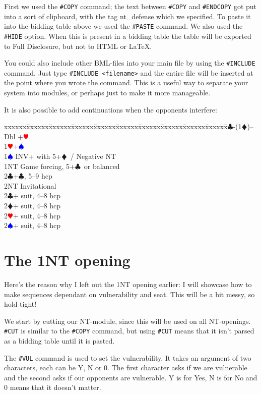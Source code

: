\documentclass[a4paper]{article}
\newcommand{\BC}{\textcolor{OliveGreen}{$\clubsuit$}}
\newcommand{\BD}{\textcolor{RedOrange}{$\vardiamondsuit$}}
\newcommand{\BH}{\textcolor{Red}{$\varheartsuit${}}}
\newcommand{\BS}{\textcolor{Blue}{$\spadesuit${}}}
\newenvironment{bidtable}
{\begin{tabbing}

xxxxxx\=xxxxxx\=xxxxxx\=xxxxxx\=xxxxxx\=xxxxxx\=xxxxxx\=xxxxxx\=xxxxxx\=xxxxxx\=\kill}
{\end{tabbing} }%
\begin{document}
First we used the \texttt{\#COPY} command; the text between \texttt{\#COPY} and \texttt{\#ENDCOPY}
got put into a sort of clipboard, with the tag nt\_defense which we
specified. To paste it into the bidding table above we used
the \texttt{\#PASTE} command. We also used the \texttt{\#HIDE} option. When this is
present in a bidding table the table will be exported to Full
Disclosure, but not to HTML or LaTeX.

You could also include other BML-files into your main file by using
the \texttt{\#INCLUDE} command. Just type \texttt{\#INCLUDE <filename>} and the entire
file will be inserted at the point where you wrote the command. This
is a useful way to separate your system into modules, or perhaps
just to make it more manageable.

It is also possible to add continuations when the opponents
interfere:

\begin{bidtable}
1\BC-(1\BD)--\+\\
Dbl +\BH \\
1\BH {}+\BS \\
1\BS \> INV+ with 5+\BD\ / Negative NT\\
1NT \> Game forcing, 5+\BC\ or balanced\\
2\BC {}+\BC , 5--9 hcp\\
2NT \> Invitational\\
2\BC {}+ suit, 4--8 hcp\\
2\BD {}+ suit, 4--8 hcp\\
2\BH {}+ suit, 4--8 hcp\\
2\BS {}+ suit, 4--8 hcp\-
\end{bidtable}

\section{The 1NT opening}

Here's the reason why I left out the 1NT opening earlier: I will
showcase how to make sequences dependant on vulnerability and
seat. This will be a bit messy, so hold tight!

We start by cutting our NT-module, since this will be used on all
NT-openings. \texttt{\#CUT} is similar to the \texttt{\#COPY} command, but using \texttt{\#CUT}
means that it isn't parsed as a bidding table until it is pasted.

The \texttt{\#VUL} command is used to set the vulnerability. It takes an
argument of two characters, each can be Y, N or 0. The first
character asks if we are vulnerable and the second asks if our
opponents are vulnerable. Y is for Yes, N is for No and 0 means that
it doesn't matter.
\end{document}
